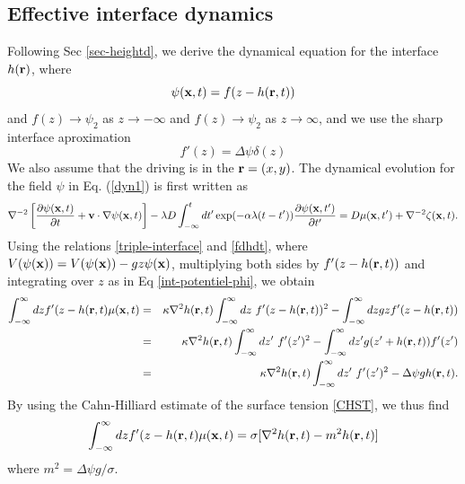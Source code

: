 \subsection{Effective interface dynamics}

Following Sec \ref{sec-heightd}, we derive the dynamical equation for the interface $h({\bf r})$, where
\begin{equation}
    \psi({\bf x},t) = f(z-h({\bf r},t))
    \label{dynamical-interface}
\end{equation}
and $f(z)\to \psi_2$ as $z\to -\infty$ and $f(z)\to \psi_2$ as  $z\to \infty$, and we use the sharp interface aproximation
\begin{equation}
    f'(z)=\Delta\psi \delta(z)
    \label{eqdelta}
\end{equation}
We also assume that the driving is in the ${\bf r}=(x,y)$. The dynamical evolution for the field $\psi$ in Eq. (\ref{dyn1}) is first written as
\begin{equation}
\nabla^{-2}\left[\frac{\partial \psi({\bf x},t)}{\partial t}+{\bf v}\cdot\nabla\psi({\bf x}, t)\right] -\lambda D\int_{-\infty}^t dt'
\exp(-\alpha\lambda(t-t')) \frac{\partial \psi({\bf x},t')}{\partial t'}=D  \mu({\bf x},t') + \nabla^{-2} \zeta({\bf x},t).\label{eqpsi}
\end{equation}
Using the relations \eqref{triple-interface} and \eqref{fdhdt}, where $V(\psi({\bf x})) = V(\psi({\bf x}))-gz \psi({\bf x})$, multiplying both sides by  $f'(z-h({\bf r},t))$ and integrating over $z$ as in Eq \eqref{int-potentiel-phi}, we obtain
\begin{eqnarray}
\int_{-\infty}^\infty dz f'(z-h({\bf r},t)\mu(\bx,t)&=& \kappa \nabla^2 h({\bf r},t)\int_{-\infty}^\infty dz\ f'(z-h({\bf r},t))^2 - \int_{-\infty}^\infty dz gz f'(z-h({\bf r},t))\nonumber \\&=&
\kappa\nabla^2 h({\bf r},t)\int_{-\infty}^\infty dz'\ f'(z')^2 - \int_{-\infty}^\infty dz' g(z' +h({\bf r},t)) f'(z')\nonumber \\
&=& \kappa\nabla^2 h({\bf r},t)\int_{-\infty}^\infty dz' \ f'(z')^2 -\Delta\psi g h({\bf r},t).
\end{eqnarray}
By using the Cahn-Hilliard estimate of the surface tension \eqref{CHST}, we thus find
\begin{equation}
    \int_{-\infty}^\infty dz f'(z-h({\bf r},t)\mu({\bf x},t) = \sigma[\nabla^2 h({\bf r},t)-m^2 h({\bf r},t)]
\end{equation}
where $m^2 = \Delta\psi g /\sigma$. 


